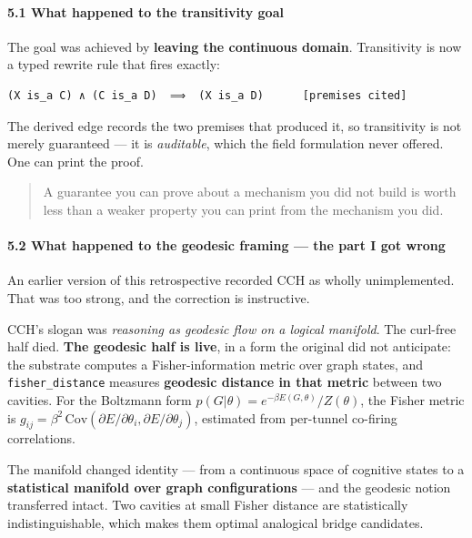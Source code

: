 \documentclass[
  11pt,
  a4paper,
]{article}
\begin{document}
\paragraph{5.1 What happened to the transitivity
goal}\label{what-happened-to-the-transitivity-goal}

The goal was achieved by \textbf{leaving the continuous domain}.
Transitivity is now a typed rewrite rule that fires exactly:

\begin{verbatim}
(X is_a C) ∧ (C is_a D)  ⟹  (X is_a D)      [premises cited]
\end{verbatim}

The derived edge records the two premises that produced it, so
transitivity is not merely guaranteed --- it is \emph{auditable}, which
the field formulation never offered. One can print the proof.

\begin{quote}
A guarantee you can prove about a mechanism you did not build is worth
less than a weaker property you can print from the mechanism you did.
\end{quote}

\paragraph{5.2 What happened to the geodesic framing --- the part I got
wrong}\label{what-happened-to-the-geodesic-framing-the-part-i-got-wrong}

An earlier version of this retrospective recorded CCH as wholly
unimplemented. That was too strong, and the correction is instructive.

CCH's slogan was \emph{reasoning as geodesic flow on a logical
manifold}. The curl-free half died. \textbf{The geodesic half is live},
in a form the original did not anticipate: the substrate computes a
Fisher-information metric over graph states, and
\texttt{fisher\_distance} measures \textbf{geodesic distance in that
metric} between two cavities. For the Boltzmann form
\(p(G|\theta) = e^{-\beta E(G,\theta)}/Z(\theta)\), the Fisher metric is
\(g_{ij} = \beta^2\,\mathrm{Cov}(\partial E/\partial\theta_i,
\partial E/\partial\theta_j)\), estimated from per-tunnel co-firing
correlations.

The manifold changed identity --- from a continuous space of cognitive
states to a \textbf{statistical manifold over graph configurations} ---
and the geodesic notion transferred intact. Two cavities at small Fisher
distance are statistically indistinguishable, which makes them optimal
analogical bridge candidates.
\end{document}
